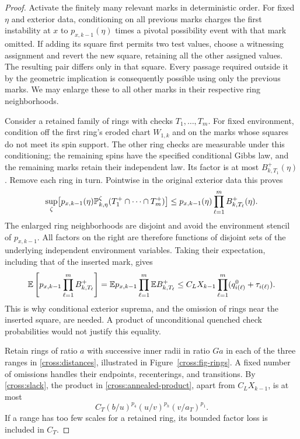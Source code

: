 \begin{proof}
Activate the finitely many relevant marks in deterministic order.
For fixed $\eta$ and exterior data, conditioning on all previous marks
charges the first instability at $x$ to
$p_{x,k-1}(\eta)$ times a pivotal possibility event with that mark omitted.
If adding its square first permits two test values, choose a witnessing
assignment and revert the new square, retaining all the other assigned
values.  The resulting pair differs only in that square.  Every passage
required outside it by the geometric implication is consequently
possible using only the previous marks.  We may enlarge these to all
other marks in their respective ring neighborhoods.

Consider a retained family of rings with checks $T_1,\ldots,T_m$.
For fixed environment, condition off the first ring's eroded chart
$W_{1,k}$ and on the marks whose squares do not meet its spin support.  The other ring
checks are measurable under this conditioning; the remaining spins have
the specified conditional Gibbs law, and the remaining marks retain
their independent law.  Its factor is at most
$B^+_{k,T_1}(\eta)$.  Remove each ring in turn.  Pointwise in the original
exterior data this proves
\begin{equation}
 \sup_\zeta\bigl[p_{x,k-1}(\eta)
     \mathbb P_{k,\eta}^{\zeta}(T_1^+\cap\cdots\cap T_m^+)\bigr]
 \leq p_{x,k-1}(\eta)\prod_{\ell=1}^m B^+_{k,T_\ell}(\eta).
 \label{cross:quenched-product}
\end{equation}
The enlarged ring neighborhoods are disjoint and avoid the environment
stencil of $p_{x,k-1}$.  All factors on the right are therefore functions
of disjoint sets of the underlying independent environment variables.
Taking their expectation, including that of the inserted mark, gives
\begin{equation}
 \mathbb E\left[p_{x,k-1}\prod_{\ell=1}^m B^+_{k,T_\ell}\right]
 =\mathbb E p_{x,k-1}\prod_{\ell=1}^m\mathbb E B^+_{k,T_\ell}
 \leq C_LX_{k-1}\prod_{\ell=1}^m(q_{i(\ell)}^0+\tau_{i(\ell)}).
 \label{cross:annealed-product}
\end{equation}
This is why conditional exterior suprema, and the omission of rings
near the inserted square, are needed.  A product of unconditional
quenched check probabilities would not justify this equality.

Retain rings of ratio $a$ with successive inner radii in ratio $Ga$ in
each of the three ranges in \eqref{cross:distances}, illustrated in
Figure~\ref{cross:fig-rings}.  A fixed number of
omissions handles their endpoints, recenterings, and transitions.  By
\eqref{cross:slack}, the product in
\eqref{cross:annealed-product}, apart from $C_LX_{k-1}$, is at most
\begin{equation}
 C_T(b/u)^{p_4}(u/v)^{p_h}(v/a_T)^{p_1}.
 \label{cross:pivotal-power}
\end{equation}
If a range has too few scales for a retained ring, its bounded factor
loss is included in $C_T$.


\end{proof}
